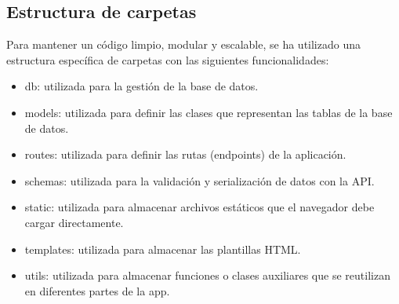 \documentclass[10pt]{book}
\begin{document}
\subsection{Estructura de carpetas}
        Para mantener un código limpio, modular y escalable, se ha utilizado una estructura específica de carpetas con las siguientes funcionalidades:
            \begin{itemize}
                \item db: utilizada para la gestión de la base de datos.
                \item models: utilizada para definir las clases que representan las tablas de la base de datos.
                \item routes: utilizada para definir las rutas (endpoints) de la aplicación.
                \item schemas: utilizada para la validación y serialización de datos con la API.
                \item static: utilizada para almacenar archivos estáticos que el navegador debe cargar directamente.
                \item templates: utilizada para almacenar las plantillas HTML.
                \item utils: utilizada para almacenar funciones o clases auxiliares que se reutilizan en diferentes partes de la app.
            \end{itemize}
\end{document}
